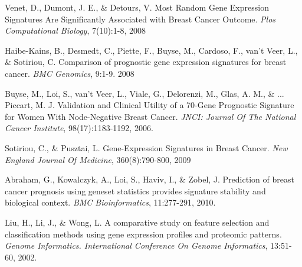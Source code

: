 \documentclass[11pt]{article}
\begin{document}
\begin{thebibliography}{9}

\cite{bibitem-Venet} Venet, D., Dumont, J. E., \& Detours, V. Most Random Gene Expression Signatures Are Significantly Associated with Breast Cancer Outcome. \emph{Plos Computational Biology}, 7(10):1-8, 2008

\cite{bibitem-Haibe} Haibe-Kains, B., Desmedt, C., Piette, F., Buyse, M., Cardoso, F., van't Veer, L., \& Sotiriou, C. Comparison of prognostic gene expression signatures for breast cancer. \emph{BMC Genomics}, 9:1-9. 2008

\cite{bibitem-Buyse} Buyse, M., Loi, S., van't Veer, L., Viale, G., Delorenzi, M., Glas, A. M., \& ... Piccart, M. J. Validation and Clinical Utility of a 70-Gene Prognostic Signature for Women With Node-Negative Breast Cancer. \emph{JNCI: Journal Of The National Cancer Institute}, 98(17):1183-1192, 2006. 

\cite{bibitem-Sotiriou} Sotiriou, C., \& Pusztai, L. Gene-Expression Signatures in Breast Cancer. \emph{New England Journal Of Medicine}, 360(8):790-800, 2009

\cite{bibitem-Abraham} Abraham, G., Kowalczyk, A., Loi, S., Haviv, I., \& Zobel, J. Prediction of breast cancer prognosis using geneset statistics provides signature stability and biological context. \emph{BMC Bioinformatics}, 11:277-291, 2010.

\cite{bibitem-Liu} Liu, H., Li, J., \& Wong, L. A comparative study on feature selection and classification methods using gene expression profiles and proteomic patterns. \emph{Genome Informatics. International Conference On Genome Informatics}, 13:51-60, 2002.
\end{thebibliography}
\end{document}
